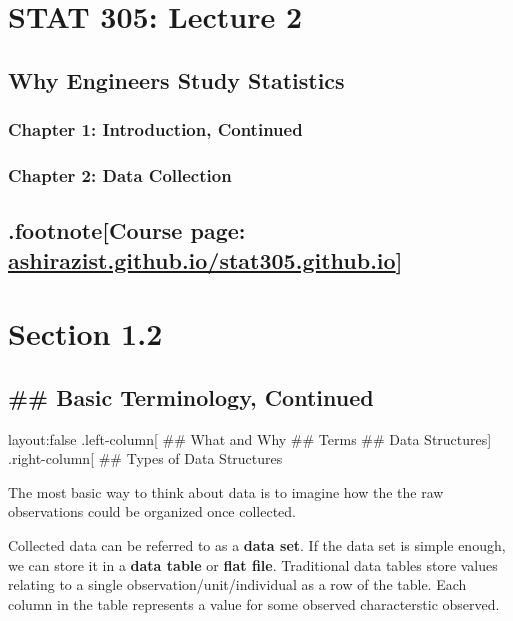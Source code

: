\documentclass[]{article}
\title{}
\author{}
\date{}
\begin{document}
\section{STAT 305: Lecture 2}\label{stat-305-lecture-2}

\subsection{Why Engineers Study
Statistics}\label{why-engineers-study-statistics}

\subsubsection{Chapter 1: Introduction,
Continued}\label{chapter-1-introduction-continued}

\subsubsection{Chapter 2: Data
Collection}\label{chapter-2-data-collection}

\subsection{\texorpdfstring{.footnote{[}Course page:
\href{https://ashirazist.github.io/stat305.github.io/}{ashirazist.github.io/stat305.github.io}{]}}{.footnote{[}Course page: ashirazist.github.io/stat305.github.io{]}}}\label{footnotecourse-page-ashirazist.github.iostat305.github.io}

\section{Section 1.2}\label{section-1.2}

\subsection{\#\# Basic Terminology,
Continued}\label{basic-terminology-continued}

layout:false .left-column{[} \#\# What and Why \#\# Terms \#\# Data
Structures{]} .right-column{[} \#\# Types of Data Structures

The most basic way to think about data is to imagine how the the raw
observations could be organized once collected.

Collected data can be referred to as a \textbf{data set}. If the data
set is simple enough, we can store it in a \textbf{data table} or
\textbf{flat file}. Traditional data tables store values relating to a
single observation/unit/individual as a row of the table. Each column in
the table represents a value for some observed characterstic observed.
\end{document}
